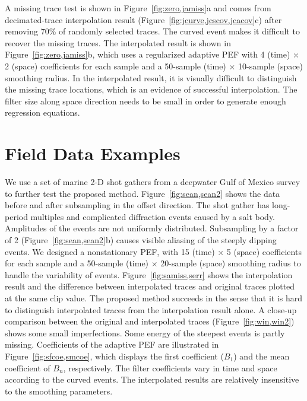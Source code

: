 A missing trace test is shown in Figure~\ref{fig:zero,jamiss}a and
comes from decimated-trace interpolation result
(Figure~\ref{fig:jcurve,jcscov,jcacov}c) after removing 70\% of
randomly selected traces. The curved event makes it difficult to
recover the missing traces. The interpolated result is shown in
Figure~\ref{fig:zero,jamiss}b, which uses a regularized adaptive PEF
with 4 (time) $\times$ 2 (space) coefficients for each sample and a
50-sample (time) $\times$ 10-sample (space) smoothing radius. In the
interpolated result, it is visually difficult to distinguish the
missing trace locations, which is an evidence of successful
interpolation. The filter size along space direction needs to be
small in order to generate enough regression equations.


\section{Field Data Examples}
We use a set of marine 2-D shot gathers from a deepwater Gulf of
Mexico survey \cite[]{Crawley99,GEO67-06-19461960} to further
test the proposed method. Figure~\ref{fig:sean,sean2} shows the data
before and after subsampling in the offset direction. The shot gather
has long-period multiples and complicated diffraction events caused by
a salt body. Amplitudes of the events are not uniformly
distributed. Subsampling by a factor of 2
(Figure~\ref{fig:sean,sean2}b) causes visible aliasing of the steeply
dipping events. We designed a nonstationary PEF, with 15 (time)
$\times$ 5 (space) coefficients for each sample and a 50-sample (time)
$\times$ 20-sample (space) smoothing radius to handle the variability
of events. Figure~\ref{fig:samiss,serr} shows the interpolation result
and the difference between interpolated traces and original traces
plotted at the same clip value. The proposed method succeeds in the
sense that it is hard to distinguish interpolated traces from the
interpolation result alone. A close-up comparison between the original
and interpolated traces (Figure~\ref{fig:win,win2}) shows some small
imperfections. Some energy of the steepest events is partly
missing. Coefficients of the adaptive PEF are illustrated in
Figure~\ref{fig:sfcoe,smcoe}, which displays the first coefficient
($B_1$) and the mean coefficient of $B_n$, respectively. The filter
coefficients vary in time and space according to the curved
events. The interpolated results are relatively insensitive to the
smoothing parameters.

